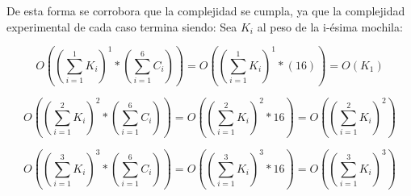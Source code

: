 De esta forma se corrobora que la complejidad se cumpla, ya que la complejidad experimental de cada caso termina siendo:
Sea $K_i$ al peso de la i-ésima mochila:

$$O\left(\left(\sum_{i=1}^{1}{K_i}\right)^{1}*\left(\sum_{i=1}^{6}{C_i}\right)\right) = O\left(\left(\sum_{i=1}^{1}{K_i}\right)^{1}*\left(16\right)\right) = O\left(K_1\right)$$

$$O\left(\left(\sum_{i=1}^{2}{K_i}\right)^{2}*\left(\sum_{i=1}^{6}{C_i}\right)\right) = O\left(\left(\sum_{i=1}^{2}{K_i}\right)^{2}*16\right) = O\left(\left(\sum_{i=1}^{2}{K_i}\right)^{2}\right)$$

$$O\left(\left(\sum_{i=1}^{3}{K_i}\right)^{3}*\left(\sum_{i=1}^{6}{C_i}\right)\right) = O\left(\left(\sum_{i=1}^{3}{K_i}\right)^{3}*16\right) = O\left(\left(\sum_{i=1}^{3}{K_i}\right)^{3}\right) $$
